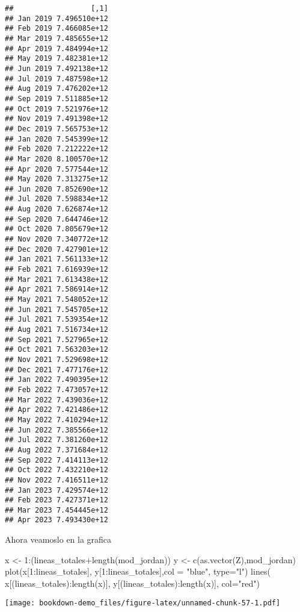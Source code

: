 \documentclass[
]{book}
\newenvironment{Shaded}{\begin{snugshade}}{\end{snugshade}}
\newcommand{\AttributeTok}[1]{\textcolor[rgb]{0.77,0.63,0.00}{#1}}
\newcommand{\DecValTok}[1]{\textcolor[rgb]{0.00,0.00,0.81}{#1}}
\newcommand{\FunctionTok}[1]{\textcolor[rgb]{0.00,0.00,0.00}{#1}}
\newcommand{\NormalTok}[1]{#1}
\newcommand{\OtherTok}[1]{\textcolor[rgb]{0.56,0.35,0.01}{#1}}
\newcommand{\SpecialCharTok}[1]{\textcolor[rgb]{0.00,0.00,0.00}{#1}}
\newcommand{\StringTok}[1]{\textcolor[rgb]{0.31,0.60,0.02}{#1}}
\begin{document}
\begin{verbatim}
##                  [,1]
## Jan 2019 7.496510e+12
## Feb 2019 7.466085e+12
## Mar 2019 7.485655e+12
## Apr 2019 7.484994e+12
## May 2019 7.482381e+12
## Jun 2019 7.492138e+12
## Jul 2019 7.487598e+12
## Aug 2019 7.476202e+12
## Sep 2019 7.511885e+12
## Oct 2019 7.521976e+12
## Nov 2019 7.491398e+12
## Dec 2019 7.565753e+12
## Jan 2020 7.545399e+12
## Feb 2020 7.212222e+12
## Mar 2020 8.100570e+12
## Apr 2020 7.577544e+12
## May 2020 7.313275e+12
## Jun 2020 7.852690e+12
## Jul 2020 7.598834e+12
## Aug 2020 7.626874e+12
## Sep 2020 7.644746e+12
## Oct 2020 7.805679e+12
## Nov 2020 7.340772e+12
## Dec 2020 7.427901e+12
## Jan 2021 7.561133e+12
## Feb 2021 7.616939e+12
## Mar 2021 7.613438e+12
## Apr 2021 7.586914e+12
## May 2021 7.548052e+12
## Jun 2021 7.545705e+12
## Jul 2021 7.539354e+12
## Aug 2021 7.516734e+12
## Sep 2021 7.527965e+12
## Oct 2021 7.563203e+12
## Nov 2021 7.529698e+12
## Dec 2021 7.477176e+12
## Jan 2022 7.490395e+12
## Feb 2022 7.473057e+12
## Mar 2022 7.439036e+12
## Apr 2022 7.421486e+12
## May 2022 7.410294e+12
## Jun 2022 7.385566e+12
## Jul 2022 7.381260e+12
## Aug 2022 7.371684e+12
## Sep 2022 7.414113e+12
## Oct 2022 7.432210e+12
## Nov 2022 7.416511e+12
## Jan 2023 7.429574e+12
## Feb 2023 7.427371e+12
## Mar 2023 7.454445e+12
## Apr 2023 7.493430e+12
\end{verbatim}

Ahora veamoslo en la grafica

\begin{Shaded}
\begin{Highlighting}[]
\NormalTok{x }\OtherTok{\textless{}{-}} \DecValTok{1}\SpecialCharTok{:}\NormalTok{(lineas\_totales}\SpecialCharTok{+}\FunctionTok{length}\NormalTok{(mod\_jordan))}
\NormalTok{y }\OtherTok{\textless{}{-}} \FunctionTok{c}\NormalTok{(}\FunctionTok{as.vector}\NormalTok{(Z),mod\_jordan)}
\FunctionTok{plot}\NormalTok{(x[}\DecValTok{1}\SpecialCharTok{:}\NormalTok{lineas\_totales], y[}\DecValTok{1}\SpecialCharTok{:}\NormalTok{lineas\_totales],}\AttributeTok{col =} \StringTok{"blue"}\NormalTok{, }\AttributeTok{type=}\StringTok{"l"}\NormalTok{)}
\FunctionTok{lines}\NormalTok{( x[(lineas\_totales)}\SpecialCharTok{:}\FunctionTok{length}\NormalTok{(x)], y[(lineas\_totales)}\SpecialCharTok{:}\FunctionTok{length}\NormalTok{(x)], }\AttributeTok{col=}\StringTok{"red"}\NormalTok{)}
\end{Highlighting}
\end{Shaded}

\texttt{[image: bookdown-demo\_files/figure-latex/unnamed-chunk-57-1.pdf]}

  
\end{document}
